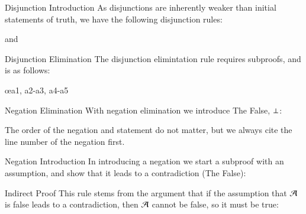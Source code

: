 \documentclass[12pt, a4paper, twoside, openright, titlepage]{book}
\begin{document}
\begin{defn}{Disjunction Introduction}{}
    As disjunctions are inherently weaker than initial statements of truth, we have the following disjunction rules: \begin{fitchproof}
    \end{fitchproof}
    and \begin{fitchproof}
    \end{fitchproof}
\end{defn}


\begin{defn}{Disjunction Elimination}{}
    The disjunction elimintation rule requires subproofs, and is as follows: \begin{fitchproof}
        \open
        \close
        \open
        \close
         \oe{a1, a2-a3, a4-a5}
    \end{fitchproof}
\end{defn}


\begin{defn}{Negation Elimination}{}
    With negation elimination we introduce The False, $\bot$: \begin{fitchproof}
         
    \end{fitchproof}
    The order of the negation and statement do not matter, but we always cite the line number of the negation first.
\end{defn}


\begin{defn}{Negation Introduction}{}
    In introducing a negation we start a subproof with an assumption, and show that it leads to a contradiction (The False): \begin{fitchproof}
        \open
        \close
         
    \end{fitchproof}
\end{defn}


\begin{defn}{Indirect Proof}{}
    This rule stems from the argument that if the assumption that $\mathcal{A}$ is false leads to a contradiction, then $\mathcal{A}$ cannot be false, so it must be true: \begin{fitchproof}
        \open
        \close
         
    \end{fitchproof}
\end{defn}
\end{document}
